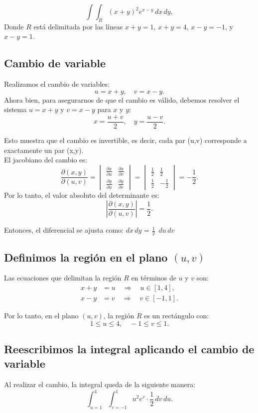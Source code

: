 \[
\int\int_R (x + y)^2 e^{x - y} \, dx \, dy,
\]
Donde \( R \) está delimitada por las líneas \( x + y = 1 \), \( x + y = 4 \), \( x - y = -1 \), y \( x - y = 1 \).

\subsection*{Cambio de variable}
Realizamos el cambio de variables:
\[
u = x + y, \quad v = x - y.
\]
Ahora bien, para asegurarnos de que el cambio es válido, debemos resolver el sistema $u=x+y$ y $v=x-y$ para $x$ y $y$:
\[
x = \frac{u + v}{2}, \quad y = \frac{u - v}{2}.
\]

Esto muestra que el cambio es invertible, es decir, cada par (u,v) corresponde a exactamente un par (x,y).\\

El jacobiano del cambio es:
\[
\frac{\partial(x, y)}{\partial(u, v)} = 
\begin{vmatrix}
	\frac{\partial x}{\partial u} & \frac{\partial x}{\partial v} \\
	\frac{\partial y}{\partial u} & \frac{\partial y}{\partial v}
\end{vmatrix} =
\begin{vmatrix}
	\frac{1}{2} & \frac{1}{2} \\
	\frac{1}{2} & -\frac{1}{2}
\end{vmatrix} = -\frac{1}{2}.
\]
Por lo tanto, el valor absoluto del determinante es:
\[
\left| \frac{\partial(x, y)}{\partial(u, v)} \right| = \frac{1}{2}.
\]

Entonces, el diferencial se ajusta como: $dx \, dy$ = $\frac{1}{2}$ $\, du \, dv$


\subsection*{Definimos la región en el plano \( (u, v) \)}
Las ecuaciones que delimitan la región \( R \) en términos de \( u \) y \( v \) son:
\begin{align*}
	x + y &= u \quad \Rightarrow \quad u \in [1, 4], \\
	x - y &= v \quad \Rightarrow \quad v \in [-1, 1].
\end{align*}

Por lo tanto, en el plano \( (u, v) \), la región \( R \) es un rectángulo con:
\[
1 \leq u \leq 4, \quad -1 \leq v \leq 1.
\]

\subsection*{Reescribimos la integral aplicando el cambio de variable}
Al realizar el cambio, la integral queda de la siguiente manera:
\[
\int_{u=1}^{4} \int_{v=-1}^{1} u^2 e^v \cdot \frac{1}{2} \, dv \, du.
\]

